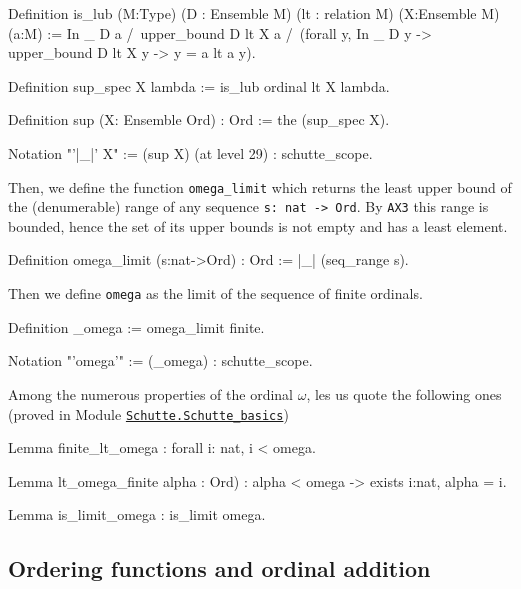 \documentclass[a4paper]{book}
\begin{document}
{\begin{Coqsrc}
Definition is_lub (M:Type)
                  (D : Ensemble M)
                  (lt : relation M)
                  (X:Ensemble M)
                  (a:M) :=
   In _ D a  /\ upper_bound  D lt X a  /\
   (forall y, In _ D y -> upper_bound  D lt X y  -> 
                  y = a \/ lt a y).
\end{Coqsrc}


\begin{Coqsrc}
Definition sup_spec X lambda := is_lub ordinal lt X lambda.

Definition sup (X: Ensemble Ord) : Ord  := the  (sup_spec X).

Notation "'|_|' X" := (sup X) (at level 29) : schutte_scope.
\end{Coqsrc}



Then, we define the function \texttt{omega\_limit} which returns the least upper bound 
of the  (denumerable) range of any sequence \texttt{s: nat -> Ord}. 
By \texttt{AX3} this range is bounded, hence the set of its upper bounds is not empty and has a least element.


\begin{Coqsrc}
Definition omega_limit (s:nat->Ord) : Ord 
  := |_| (seq_range s).
\end{Coqsrc}

Then we define \texttt{omega} as the limit of the sequence of finite ordinals.


\label{sect:notation-omega}
\begin{Coqsrc}
Definition _omega := omega_limit finite.

Notation "'omega'" := (_omega) : schutte_scope.
\end{Coqsrc}



Among the numerous properties of the ordinal $\omega$, les us quote the following ones
(proved in Module 
\href{../src/html/hydras.Schutte.Schutte_basics.html\#finite_lt_omega}{\texttt{Schutte.Schutte\_basics}})

\begin{Coqsrc}
Lemma finite_lt_omega : forall i: nat,  i < omega.

Lemma lt_omega_finite alpha : Ord) : 
  alpha < omega ->  exists i:nat, alpha =  i.

Lemma is_limit_omega : is_limit omega.
\end{Coqsrc}


\subsection{Ordering functions and ordinal addition}

}
\end{document}
